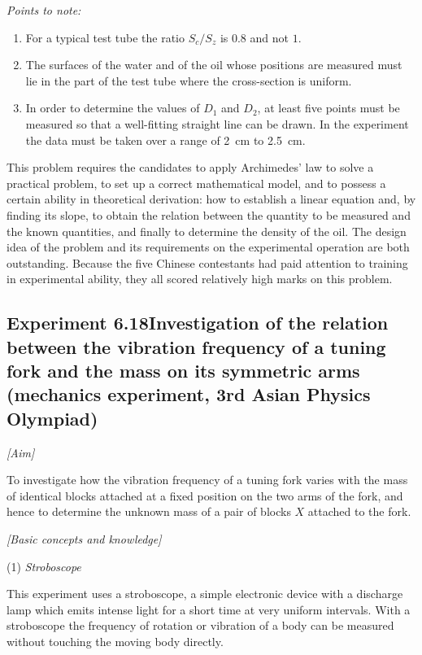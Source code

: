 \noindent\textit{Points to note:}
\begin{enumerate}[label=(\arabic*),leftmargin=2.2em,itemsep=1pt,topsep=2pt]
\item For a typical test tube the ratio $S_c/S_z$ is $0.8$ and not $1$.
\item The surfaces of the water and of the oil whose positions are measured must lie in the part of the test tube where the cross-section is uniform.
\item In order to determine the values of $D_1$ and $D_2$, at least five points must be measured so that a well-fitting straight line can be drawn. In the experiment the data must be taken over a range of \SI{2}{cm} to \SI{2.5}{cm}.
\end{enumerate}

\begin{commentary}
This problem requires the candidates to apply Archimedes' law to solve a practical problem, to set up a correct mathematical model, and to possess a certain ability in theoretical derivation: how to establish a linear equation and, by finding its slope, to obtain the relation between the quantity to be measured and the known quantities, and finally to determine the density of the oil. The design idea of the problem and its requirements on the experimental operation are both outstanding. Because the five Chinese contestants had paid attention to training in experimental ability, they all scored relatively high marks on this problem.
\end{commentary}

\subsection*{Experiment 6.18\quad Investigation of the relation between the vibration frequency of a tuning fork and the mass on its symmetric arms (mechanics experiment, 3rd Asian Physics Olympiad)}

\noindent\textit{[Aim]}

To investigate how the vibration frequency of a tuning fork varies with the mass of identical blocks attached at a fixed position on the two arms of the fork, and hence to determine the unknown mass of a pair of blocks $X$ attached to the fork.

\noindent\textit{[Basic concepts and knowledge]}

(1) \textit{Stroboscope}

This experiment uses a stroboscope, a simple electronic device with a discharge lamp which emits intense light for a short time at very uniform intervals. With a stroboscope the frequency of rotation or vibration of a body can be measured without touching the moving body directly.

